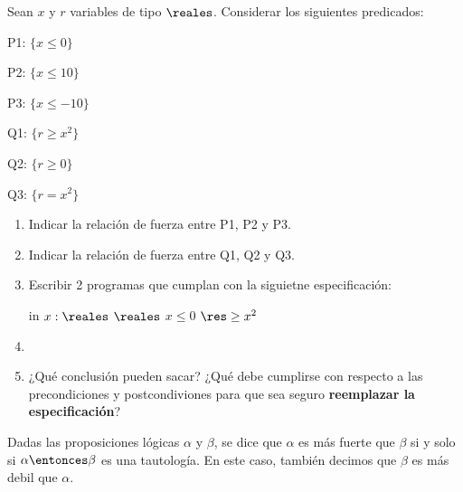 \begin{enunciado}{\ejercicio}
  Sean $x$ y $r$ variables de tipo $\reales$. Considerar los siguientes predicados:
  \begin{multicols}{2}
    P1: $\{x \leq 0\}$\par
    P2: $\{x \leq 10\}$\par
    P3: $\{x \leq -10\}$\par
    Q1: $\{r \geq x^2\}$\par
    Q2: $\{r \geq 0\}$\par
    Q3: $\{r = x^2\}$\par
  \end{multicols}

  \begin{enumerate}[label=\alph*)]
    \item Indicar la relación de fuerza entre P1, P2 y P3.
    \item Indicar la relación de fuerza entre Q1, Q2 y Q3.
    \item Escribir 2 programas que cumplan con la siguietne especificación:\par
          {in $x:\reales$}
          {$\reales$}
          {$x \leq 0$}
          {$\res \geq x^2$}
    \item \hacer
    \item ¿Qué conclusión pueden sacar? ¿Qué debe cumplirse con respecto a las precondiciones y postcondiviones para que sea seguro
          \textbf{reemplazar la especificación}?
  \end{enumerate}
\end{enunciado}

Dadas las proposiciones lógicas $\alpha$ y $\beta$, se dice que $\alpha$ es más fuerte que
$\beta$ si y solo si $\alpha \entonces \beta$ es una tautología.
En este caso, también decimos que $\beta$ es más debil que $\alpha$.

